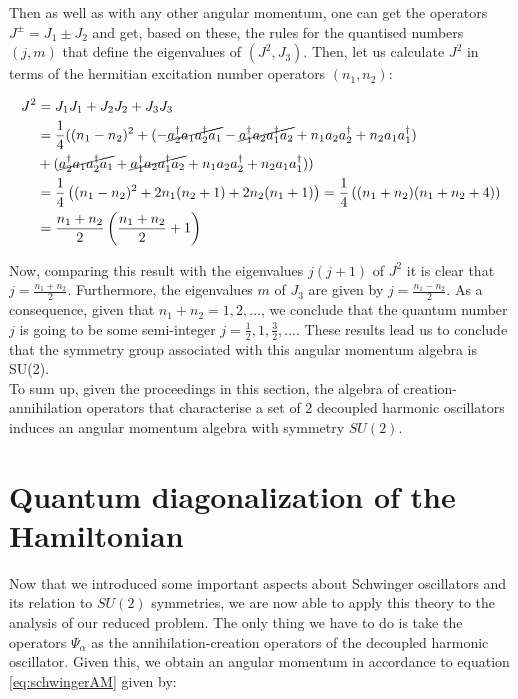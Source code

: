 Then as well as with any other angular momentum, one can get the operators $J^\pm = J_1\pm J_2$ and get, based on these, the rules for the quantised numbers $(j,m)$ that define the eigenvalues of $(J^2,J_3)$. Then, let us calculate $J^2$ in terms of the hermitian excitation number operators $(n_1,n_2)$:

\begin{align*}
J^2 &= J_1J_1+J_2J_2+J_3J_3\\
&= \frac{1}{4}( (n_1-n_2)^2 +(-\cancel{a_2^\dagger a_1a_2^\dagger a_1}- \cancel{a_1^\dagger a_2a_1^\dagger a_2}+n_1a_2a_2^\dagger+n_2a_1a_1^\dagger)\\
&+(\cancel{a_2^\dagger a_1a_2^\dagger a_1}+ \cancel{a_1^\dagger a_2a_1^\dagger a_2}+n_1a_2a_2^\dagger+n_2a_1a_1^\dagger))\\
&= \frac{1}{4}\left( (n_1-n_2)^2 + 2n_1(n_2+1)+2n_2(n_1+1) \right) = \frac{1}{4}\left( (n_1+n_2)(n_1+n_2+4) \right)\\
&= \frac{n_1+n_2}{2}\left( \frac{n_1+n_2}{2}+1 \right)
\end{align*}

Now, comparing this result with the eigenvalues $j(j+1)$ of $J^2$ it is clear that $j = \frac{n_1+n_2}{2}$. Furthermore, the eigenvalues $m$ of $J_3$ are given by  $j = \frac{n_1-n_2}{2}$. As a consequence, given that $n_1+n_2 = 1,2,...$, we conclude that the quantum number $j$ is going to be some semi-integer $j= \frac{1}{2},1,\frac{3}{2},...$. These results lead us to conclude that the symmetry group associated with this angular momentum algebra is SU(2).\\

To sum up, given the proceedings in this section, the algebra of creation-annihilation operators that characterise a set of 2 decoupled harmonic oscillators induces an angular momentum algebra with symmetry $SU(2)$.

\section{Quantum diagonalization of the Hamiltonian}
Now that we introduced some important aspects about Schwinger oscillators and its relation to $SU(2)$ symmetries, we are now able to apply this theory to the analysis of our reduced problem. The only thing we have to do is take the operators $\Psi_\alpha$ as the annihilation-creation operators of the decoupled harmonic oscillator. Given this, we obtain an angular momentum in accordance to equation \eqref{eq:schwingerAM} given by:

